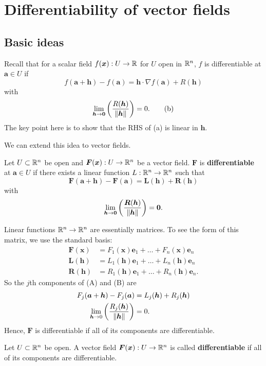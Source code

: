 \chapter{Differentiability of vector fields}
\section{Basic ideas}

Recall that for a scalar field 
$f(\bm x): U \to \mathbb{R}$ 
for $U$ open in $\mathbb{R}^n$,
$f$ is differentiable at $\bm a \in U$ if
\[ f(\bm a + \bm h) - f(\bm a) = \bm h \cdot \nabla f(\bm a) + R(\bm h) \tag{a} \]
with
\[ \lim_{\bm h \to \bm 0} \left(\frac{R(\bm h)}{\left\lVert\bm h\right\rVert}\right) = 0. \tag{b} \]
The key point here is to show that the RHS of (a) is linear in $\bm h$.

We can extend this idea to vector fields.

Let $U \subset \mathbb{R}^n$ be open and $\bm F(\bm x): U \to \mathbb{R}^n$ be a vector field.
$\bm F$ is \textbf{differentiable} at $\bm a \in U$ if there exists a linear function
$L: \mathbb{R}^n \to \mathbb{R}^n$ such that
\[
    \bm F(\bm a + \bm h) - \bm F(\bm a) = \bm L(\bm h) + \bm R(\bm h)
\]
with
\[
    \lim_{\bm h \to \bm 0} \left( \frac{\bm R(\bm h)}{\left\lVert\bm h\right\rVert} \right) = \bm 0.
\]

Linear functions $\mathbb{R}^n \to \mathbb{R}^n$ are essentially matrices.
To see the form of this matrix, we use the standard basis:
\begin{align*}
    \bm F(\bm x) &= F_1(\bm x)\bm e_1 + \ldots + F_n(\bm x) \bm e_n \\
    \bm L(\bm h) &= L_1(\bm h)\bm e_1 + \ldots + L_n(\bm h) \bm e_n \\
    \bm R(\bm h) &= R_1(\bm h)\bm e_1 + \ldots + R_n(\bm h) \bm e_n.
\end{align*}
So the $j$th components of (A) and (B) are
\begin{align*}
    F_j(\bm a + \bm h) - F_j(\bm a) &= L_j(\bm h) + R_j(\bm h) \\
    \lim_{\bm h \to 0} \left(\frac{R_j(\bm h)}{\left\lVert\bm h\right\rVert}\right) &= 0.
\end{align*}
Hence, $\bm F$ is differentiable if all of its components are differentiable.

\begin{definition}
    Let $U \subset \mathbb{R}^n$ be open.
    A vector field $\bm F(\bm x): U \to \mathbb{R}^n$ is called \textbf{differentiable}
    if all of its components are differentiable.
\end{definition}

